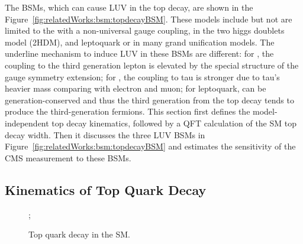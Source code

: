 The BSMs, which can cause LUV in the top decay, are shown in the Figure~\ref{fig:relatedWorks:bsm:topdecayBSM}. These models include but not are limited to the \PWpr with a non-universal gauge coupling, \PSHp in the two higgs doublets model (2HDM), and leptoquark or \PLQ in many grand unification models. The underline mechanism to induce LUV in these BSMs are different: for \PWpr, the coupling to the third generation lepton is elevated by the special structure of the gauge symmetry extension; for \PSHp, the coupling to tau is stronger due to tau's heavier mass comparing with electron and muon; for leptoquark, \PLQ can be generation-conserved and thus the third generation \PLQ from the top decay tends to produce the third-generation fermions. This section first defines the model-independent top decay kinematics, followed by a QFT calculation of the SM top decay width. Then it discusses the three LUV BSMs in Figure~\ref{fig:relatedWorks:bsm:topdecayBSM} and estimates the sensitivity of the CMS \BWl measurement to these BSMs.



\subsection{Kinematics of Top Quark Decay}
\label{sec:relatedWorks:bsm:kinematics}

\begin{figure}[ht]
    \centering
    ;
    \caption{Top quark decay in the SM.}
    \label{fig:relatedWorks:bsm:topdecaySM}
\end{figure}

